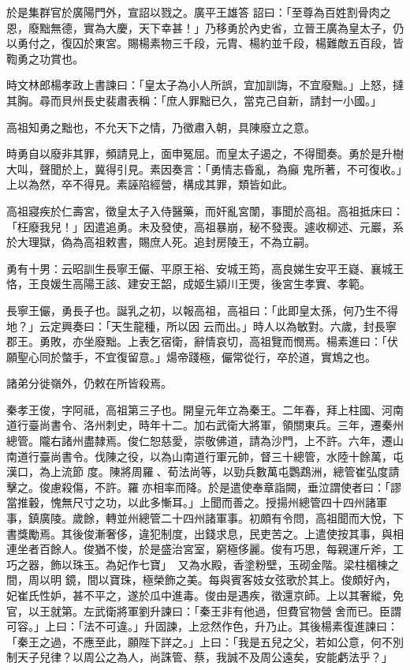 \begin{pinyinscope}
 於是集群官於廣陽門外，宣詔以戮之。廣平王雄答
 詔曰：「至尊為百姓割骨肉之恩，廢黜無德，實為大慶，天下幸甚！」乃移勇於內史省，立晉王廣為皇太子，仍以勇付之，復囚於東宮。賜楊素物三千段，元胄、楊約並千段，楊難敵五百段，皆鞫勇之功賞也。



 時文林郎楊孝政上書諫曰：「皇太子為小人所誤，宜加訓誨，不宜廢黜。」上怒，撻其胸。尋而貝州長史裴肅表稱：「庶人罪黜已久，當克己自新，請封一小國。」



 高祖知勇之黜也，不允天下之情，乃徵肅入朝，具陳廢立之意。



 時勇自以廢非其罪，頻請見上，面申冤屈。而皇太子遏之，不得聞奏。勇於是升樹大叫，聲聞於上，冀得引見。素因奏言：「勇情志昏亂，為癲
 鬼所著，不可復收。」上以為然，卒不得見。素誣陷經營，構成其罪，類皆如此。



 高祖寢疾於仁壽宮，徵皇太子入侍醫藥，而奸亂宮闈，事聞於高祖。高祖抵床曰：「枉廢我兒！」因遣追勇。未及發使，高祖暴崩，秘不發喪。遽收柳述、元巖，系於大理獄，偽為高祖敕書，賜庶人死。追封房陵王，不為立嗣。



 勇有十男：云昭訓生長寧王儼、平原王裕、安城王筠，高良娣生安平王嶷、襄城王恪，王良媛生高陽王該、建安王韶，成姬生潁川王煚，後宮生孝實、孝範。



 長寧王儼，勇長子也。誕乳之初，以報高祖，高祖曰：「此即皇太孫，何乃生不得地？」云定興奏曰：「天生龍種，所以因
 云而出。」時人以為敏對。六歲，封長寧郡王。勇敗，亦坐廢黜。上表乞宿衛，辭情哀切，高祖覽而憫焉。楊素進曰：「伏願聖心同於螫手，不宜復留意。」煬帝踐極，儼常從行，卒於道，實鴆之也。



 諸弟分徙嶺外，仍敕在所皆殺焉。



 秦孝王俊，字阿祗，高祖第三子也。開皇元年立為秦王。二年春，拜上柱國、河南道行臺尚書令、洛州刺史，時年十二。加右武衛大將軍，領關東兵。三年，遷秦州總管。隴右諸州盡隸焉。俊仁恕慈愛，崇敬佛道，請為沙門，上不許。六年，遷山南道行臺尚書令。伐陳之役，以為山南道行軍元帥，督三十總管，水陸十餘萬，屯漢口，為上流節
 度。陳將周羅、荀法尚等，以勁兵數萬屯鸚鵡洲，總管崔弘度請擊之。俊慮殺傷，不許。羅亦相率而降。於是遣使奉章詣闕，垂泣謂使者曰：「謬當推轂，愧無尺寸之功，以此多慚耳。」上聞而善之。授揚州總管四十四州諸軍事，鎮廣陵。歲餘，轉並州總管二十四州諸軍事。初頗有令問，高祖聞而大悅，下書獎勵焉。其後俊漸奢侈，違犯制度，出錢求息，民吏苦之。上遣使按其事，與相連坐者百餘人。俊猶不悛，於是盛治宮室，窮極侈麗。俊有巧思，每親運斤斧，工巧之器，飾以珠玉。為妃作七寶」，又為水殿，香塗粉壁，玉砌金階。梁柱楣棟之間，周以明
 鏡，間以寶珠，極榮飾之美。每與賓客妓女弦歌於其上。俊頗好內，妃崔氏性妒，甚不平之，遂於瓜中進毒。俊由是遇疾，徵還京師。上以其奢縱，免官，以王就第。左武衛將軍劉升諫曰：「秦王非有他過，但費官物營舍而已。臣謂可容。」上曰：「法不可違。」升固諫，上忿然作色，升乃止。其後楊素復進諫曰：「秦王之過，不應至此，願陛下詳之。」上曰：「我是五兒之父，若如公意，何不別制天子兒律？以周公之為人，尚誅管、蔡，我誠不及周公遠矣，安能虧法乎？」




\end{pinyinscope}

